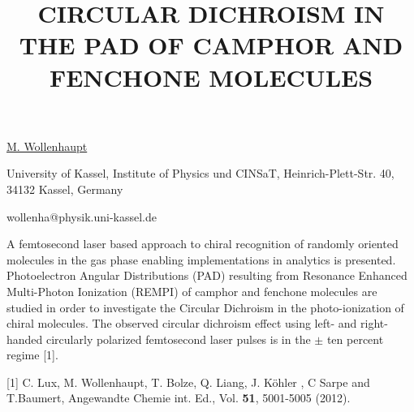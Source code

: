 \title{CIRCULAR DICHROISM IN THE PAD OF CAMPHOR AND FENCHONE MOLECULES}

\underline{M. Wollenhaupt} 

{\normalsize{\vspace{-4mm}
University of Kassel, Institute of Physics und CINSaT, Heinrich-Plett-Str. 40, 34132 Kassel, Germany

\email wollenha@physik.uni-kassel.de}}

A femtosecond laser based approach to chiral recognition of randomly oriented molecules in the gas phase enabling implementations in analytics is presented. Photoelectron Angular Distributions (PAD) resulting from Resonance Enhanced Multi-Photon Ionization (REMPI) of camphor and fenchone molecules are studied in order to investigate the Circular Dichroism in the photo-ionization of chiral molecules.  The observed circular dichroism effect using left- and right-handed circularly polarized femtosecond laser pulses is in the $\pm$ ten percent regime [1].

{\normalsize
[1] C. Lux, M. Wollenhaupt, T. Bolze, Q. Liang, J. K\"ohler , C Sarpe and T.Baumert,
Angewandte Chemie int. Ed., Vol. \textbf{51}, 5001-5005 (2012).
}

\vspace{\baselineskip} 